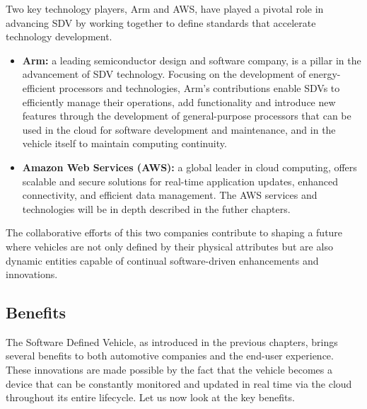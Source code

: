 Two key technology players, Arm and AWS, have played a pivotal role in advancing SDV by working together to define standards that accelerate technology development.
\begin{itemize}
    \item \textbf{Arm:} a leading semiconductor design and software company, is a pillar in the advancement of SDV technology. Focusing on the development of energy-efficient processors and technologies, Arm's contributions enable SDVs to efficiently manage their operations, add functionality and introduce new features through the development of general-purpose processors that can be used in the cloud for software development and maintenance, and in the vehicle itself to maintain computing continuity.
    \item \textbf{Amazon Web Services (AWS):} a global leader in cloud computing, offers scalable and secure solutions for real-time application updates, enhanced connectivity, and efficient data management. The AWS services and technologies will be in depth described in the futher chapters.
\end{itemize}

The collaborative efforts of this two companies contribute to shaping a future where vehicles are not only defined by their physical attributes but are also dynamic entities capable of continual software-driven enhancements and innovations.

\subsection{Benefits}
The Software Defined Vehicle, as introduced in the previous chapters, brings several benefits to both automotive companies and the end-user experience.  These innovations are made possible by the fact that the vehicle becomes a device that can be constantly monitored and updated in real time via the cloud throughout its entire lifecycle. Let us now look at the key benefits.

